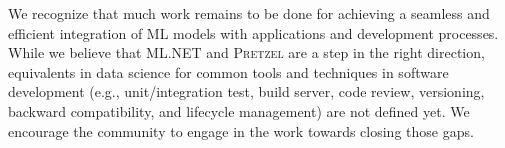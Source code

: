\documentclass[11pt]{article}
\newcommand{\pretzel}{\textsc{Pretzel}\xspace}
\newcommand{\mlnet}{ML.NET\xspace}
\begin{document}
We recognize that much work remains to be done for achieving a seamless and efficient integration of ML models with applications and development processes. 
While we believe that \mlnet and \pretzel are a step in the right direction, equivalents in data science for common tools and techniques in software development (e.g., unit/integration test, build server, code review, versioning, backward compatibility, and lifecycle management) are not defined yet. 
We encourage the community to engage in the work towards closing those gaps.

\end{document}
